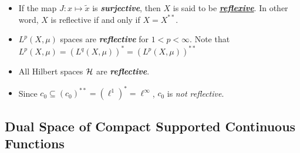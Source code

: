 \documentclass[11pt]{article}
\begin{document}
\begin{itemize}
\item \begin{definition}
If the map $J: x \mapsto \widetilde{x}$ is \emph{\textbf{surjective}}, then $X$ is said to be \underline{\emph{\textbf{reflexive}}}. In other word, $X$ is reflective if and only if $X = X^{**}$.
\end{definition}

\item \begin{example}
$L^{p}(X, \mu)$ spaces are \emph{\textbf{reflective}} for $1 < p < \infty$. Note that $L^{p}(X, \mu) = (L^{q}(X, \mu))^{*} =  (L^{p}(X, \mu))^{**}$
\end{example}

\item \begin{example}
All Hilbert spaces ${\mathcal H}$ are \emph{\textbf{reflective}}.
\end{example}

\item \begin{example}
Since $c_0 \subseteq  (c_0)^{**} = (\ell^1)^{*} = \ell^{\infty}$, $c_0$ is \emph{not reflective}.
\end{example}
\end{itemize}


\subsection{Dual Space of Compact Supported Continuous Functions}
\end{document}
